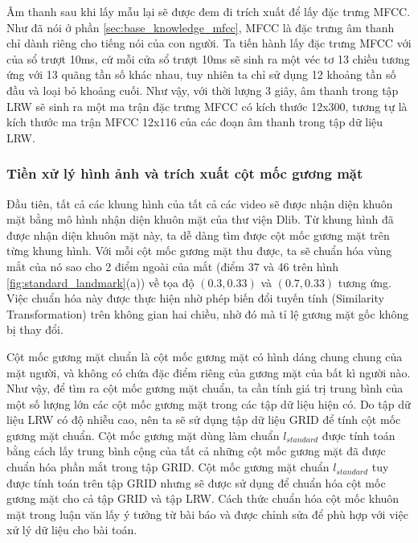 Âm thanh sau khi lấy mẫu lại sẽ được đem đi trích xuất để lấy đặc trưng MFCC. Như đã nói ở phần \ref{sec:base_knowledge_mfcc}, MFCC là đặc trưng âm thanh chỉ dành riêng cho tiếng nói của con người. Ta tiến hành lấy đặc trưng MFCC với của sổ trượt 10ms, cứ mỗi cửa sổ trượt 10ms sẽ sinh ra một véc tơ 13 chiều tương ứng với 13 quãng tần số khác nhau, tuy nhiên ta chỉ sử dụng 12 khoảng tần số đầu và loại bỏ khoảng cuối. Như vậy, với thời lượng 3 giây, âm thanh trong tập LRW sẽ sinh ra một ma trận đặc trưng MFCC có kích thước 12x300, tương tự là kích thước ma trận MFCC 12x116 của các đoạn âm thanh trong tập dữ liệu LRW.

\subsubsection{Tiền xử lý hình ảnh và trích xuất cột mốc gương mặt}

Đầu tiên, tất cả các khung hình của tất cả các video sẽ được nhận diện khuôn mặt bằng mô hình nhận diện khuôn mặt của thư viện Dlib. Từ khung hình đã được nhận diện khuôn mặt này, ta dễ dàng tìm được cột mốc gương mặt trên từng khung hình. Với mỗi cột mốc gương mặt thu được, ta sẽ chuẩn hóa vùng mắt của nó sao cho 2 điểm ngoài của mắt (điểm 37 và 46 trên hình \ref{fig:standard_landmark}(a)) về tọa độ $(0.3, 0.33)$ và $(0.7, 0.33)$ tương ứng. Việc chuẩn hóa này được thực hiện nhờ phép biến đổi tuyến tính (Similarity Transformation) trên không gian hai chiều, nhờ đó mà tỉ lệ gương mặt gốc không bị thay đổi.

Cột mốc gương mặt chuẩn là cột mốc gương mặt có hình dáng chung chung của mặt người, và không có chứa đặc điểm riêng của gương mặt của bất kì người nào. Như vậy, để tìm ra cột mốc gương mặt chuẩn, ta cần tính giá trị trung bình của một số lượng lớn các cột mốc gương mặt trong các tập dữ liệu hiện có. Do tập dữ liệu LRW có độ nhiễu cao, nên ta sẽ sử dụng tập dữ liệu GRID để tính cột mốc gương mặt chuẩn. Cột mốc gương mặt dùng làm chuẩn $l_{standard}$ được tính toán bằng cách lấy trung bình cộng của tất cả những cột mốc gương mặt đã được chuẩn hóa phần mắt trong tập GRID. Cột mốc gương mặt chuẩn $l_{standard}$ tuy được tính toán trên tập GRID nhưng sẽ được sử dụng để chuẩn hóa cột mốc gương mặt cho cả tập GRID và tập LRW. Cách thức chuẩn hóa cột mốc khuôn mặt trong luận văn lấy ý tưởng từ bài báo \cite{gen_face_landmark} và được chỉnh sửa để phù hợp với việc xử lý dữ liệu cho bài toán.

